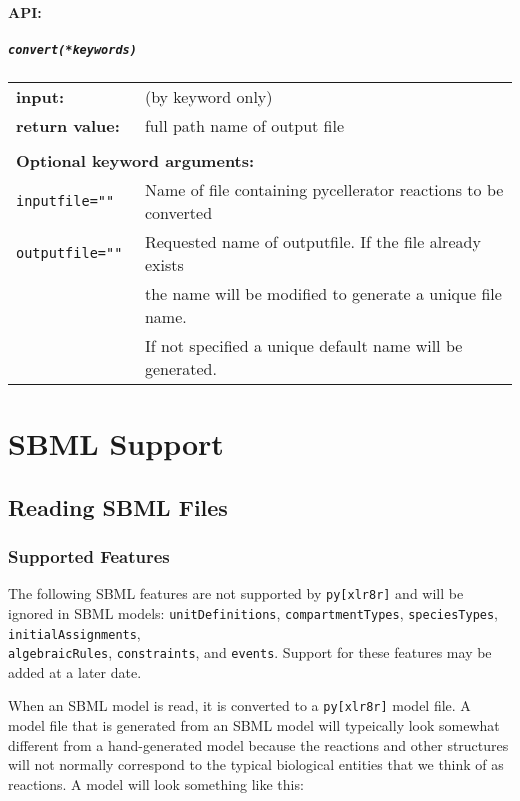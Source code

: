 \paragraph{API:\\}

\subparagraph{\tt convert(*keywords)\\}

\begin{tabular}{ll}
\textbf{input:} & (by keyword only)\\
\textbf{return value:}& full path name of output file \\  \\
\multicolumn{2}{l}{\textbf{Optional keyword arguments:}}\\
\tt{inputfile=""} & Name of file containing pycellerator reactions to be converted\\
\tt{outputfile=""} & Requested name of outputfile. If the file already exists \\
& the name will be modified to generate a unique file name. \\
& If not specified a unique default name will be generated.
\end{tabular}

\newpage
\section[SBML]{SBML Support}

\subsection{Reading SBML Files}

\subsubsection{Supported Features}

The following SBML features are not supported by {\tt py[xlr8r]} and will be ignored in SBML models: \hfill {\tt unitDefinitions}, {\tt compartmentTypes}, {\tt speciesTypes}, {\tt initialAssignments}, \\{ \tt algebraicRules},  {\tt constraints}, and  {\tt events}.  Support for these features may be added at a later date. 

When an SBML model is read, it is converted to a {\tt py[xlr8r]} model file.  A model file that is generated from an SBML model will typeically look somewhat different from a hand-generated model because the reactions and other structures will not normally correspond to the typical biological entities that we think of as reactions. A model will look something like this:

